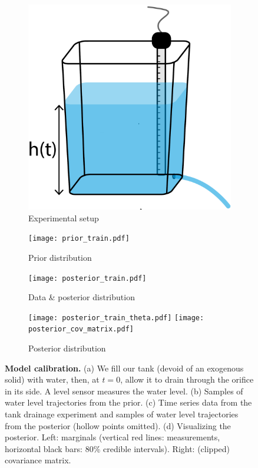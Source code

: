 \documentclass[a4paper,fleqn]{cas-dc}
\begin{document}
\begin{figure}[!ht]
    \centering
        \begin{subfigure}[b]{0.2\textwidth}
    	\includegraphics[width=\textwidth]{naked_tank.pdf}
	\caption{Experimental setup} \label{fig:naked_tank}
    \end{subfigure}
    
     \begin{subfigure}[b]{0.35\textwidth}
    	\texttt{[image: prior\_train.pdf]}
	\caption{Prior distribution} \label{fig:prior_train}
    \end{subfigure}
     \begin{subfigure}[b]{0.35\textwidth}
    	\texttt{[image: posterior\_train.pdf]}
	\caption{Data \& posterior distribution} \label{fig:posterior_train}
    \end{subfigure}
    
     \begin{subfigure}[b]{\textwidth}
     \center
    	\texttt{[image: posterior\_train\_theta.pdf]}
	\texttt{[image: posterior\_cov\_matrix.pdf]}
	\caption{Posterior distribution} \label{fig:posterior_train_theta}
    \end{subfigure}
    \caption{
      \textbf{Model calibration.}
      (a) We fill our tank (devoid of an exogenous solid) with water, then, at $t=0$, allow it to drain through the orifice in its side. A level sensor measures the water level.     
      (b) Samples of water level trajectories from the prior.
      (c) Time series data from the tank drainage experiment and samples of water level trajectories from the posterior (hollow points omitted).
       (d) Visualizing the posterior. Left: marginals (vertical red lines: measurements, horizontal black bars: 80\% credible intervals). Right: (clipped) covariance matrix.      
      }
\end{figure}
\end{document}
